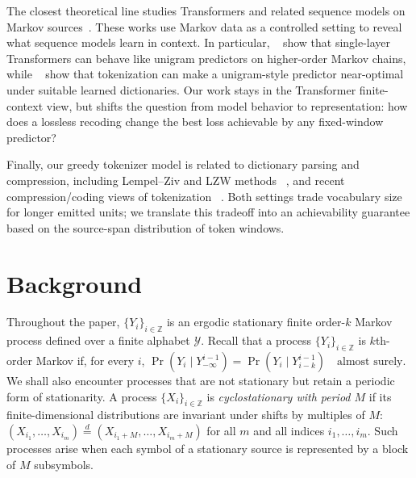 \documentclass{article}
\theoremstyle{plain}
\theoremstyle{definition}
\theoremstyle{remark}
\begin{document}
    The closest theoretical line studies Transformers and related sequence models on
    Markov sources~\citep{makkuvaAttentionMarkovCurious2024,
    rajaramanAnalysisTokenizationTransformers2024,
    rajaramanTransformersMarkovData2024a,
    edelmanEvolutionStatisticalInduction2024,
    bondaschiMarkovLaplaceHow2025}. These works use Markov data as a controlled
    setting to reveal what sequence models learn in context. In particular, ~\citep{makkuvaAttentionMarkovCurious2024} show that single-layer
    Transformers can behave like unigram predictors on higher-order Markov chains,
    while ~\citep{rajaramanAnalysisTokenizationTransformers2024}
    show that tokenization can make a unigram-style predictor near-optimal under
    suitable learned dictionaries. Our work stays in the Transformer finite-context
    view, but shifts the question from model behavior to representation: how does a
    lossless recoding change the best loss achievable by any fixed-window predictor?
    
    Finally, our greedy tokenizer model is related to dictionary parsing and
    compression, including Lempel--Ziv and LZW methods
    ~\citep{zivUniversalAlgorithmSequential1977,
    zivCompressionIndividualSequences1978,welchTechniqueHighPerformanceData1984},
    and recent compression/coding views of tokenization
    ~\citep{zouharTokenizationNoiselessChannel2023,
    schmidtTokenizationMoreCompression2024}. Both settings trade vocabulary size for
    longer emitted units; we translate this tradeoff into an achievability guarantee
    based on the source-span distribution of token windows.
    
    \section{Background}
    \label{sec:background}
    Throughout the paper, $\{Y_i\}_{i\in\mathbb{Z}}$ is an ergodic stationary finite order-$k$ Markov process defined over a
    finite alphabet $\mathcal{Y}$.  Recall that a process $\{Y_i\}_{i\in\mathbb{Z}}$ is $k$th-order Markov if,
    for every $i$,
    $
        \Pr(Y_i \mid Y_{-\infty}^{i-1})
        =
        \Pr(Y_i \mid Y_{i-k}^{i-1})
        \quad \text{almost surely}
         \label{eq:kth-order-markov}
    $. We shall also encounter processes that are not stationary but retain a
    periodic form of stationarity.  A process $\{X_i\}_{i\in\mathbb{Z}}$ is
    \emph{cyclostationary with period $M$} if its finite-dimensional
    distributions are invariant under shifts by multiples of $M$:
    $
        (X_{i_1},\ldots,X_{i_m})
        \overset{d}{=}
        (X_{i_1+M},\ldots,X_{i_m+M})
        \label{eq:cyclostationarity}
    $
    for all $m$ and all indices $i_1,\ldots,i_m$.  Such processes arise when
    each symbol of a stationary source is represented by a block of $M$
    subsymbols.
    
\end{document}
